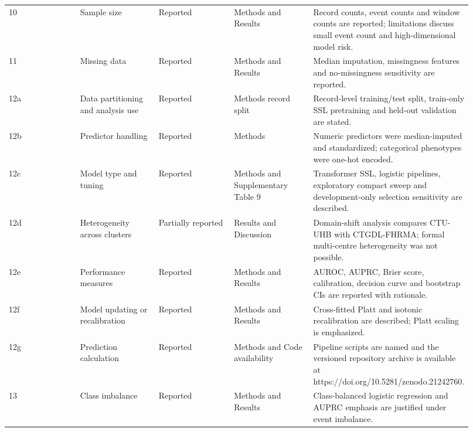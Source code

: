 \documentclass[11pt]{article}
\begin{document}
\begin{landscape}
\begin{longtable}{L{0.184\linewidth} L{0.184\linewidth} L{0.184\linewidth} L{0.184\linewidth} L{0.184\linewidth}}
10 & Sample size & Reported & Methods and Results & Record counts, event counts and window counts are reported;\allowbreak{} limitations discuss small event count and high-\allowbreak{}dimensional model risk.\allowbreak{} \\
11 & Missing data & Reported & Methods and Results & Median imputation, missingness features and no-\allowbreak{}missingness sensitivity are reported.\allowbreak{} \\
12a & Data partitioning and analysis use & Reported & Methods record split & Record-\allowbreak{}level training/\allowbreak{}test split, train-\allowbreak{}only SSL pretraining and held-\allowbreak{}out validation are stated.\allowbreak{} \\
12b & Predictor handling & Reported & Methods & Numeric predictors were median-\allowbreak{}imputed and standardized;\allowbreak{} categorical phenotypes were one-\allowbreak{}hot encoded.\allowbreak{} \\
12c & Model type and tuning & Reported & Methods and Supplementary Table 9 & Transformer SSL, logistic pipelines, exploratory compact sweep and development-\allowbreak{}only selection sensitivity are described.\allowbreak{} \\
12d & Heterogeneity across clusters & Partially reported & Results and Discussion & Domain-\allowbreak{}shift analysis compares CTU-\allowbreak{}UHB with CTGDL-\allowbreak{}FHRMA;\allowbreak{} formal multi-\allowbreak{}centre heterogeneity was not possible.\allowbreak{} \\
12e & Performance measures & Reported & Methods and Results & AUROC, AUPRC, Brier score, calibration, decision curve and bootstrap CIs are reported with rationale.\allowbreak{} \\
12f & Model updating or recalibration & Reported & Methods and Results & Cross-\allowbreak{}fitted Platt and isotonic recalibration are described;\allowbreak{} Platt scaling is emphasized.\allowbreak{} \\
12g & Prediction calculation & Reported & Methods and Code availability & Pipeline scripts are named and the versioned repository archive is available at https:\allowbreak{}/\allowbreak{}/\allowbreak{}doi.\allowbreak{}org/\allowbreak{}10.\allowbreak{}5281/\allowbreak{}zenodo.\allowbreak{}21242760.\allowbreak{} \\
13 & Class imbalance & Reported & Methods and Results & Class-\allowbreak{}balanced logistic regression and AUPRC emphasis are justified under event imbalance.\allowbreak{} \\

\end{longtable}
\end{landscape}
\end{document}
